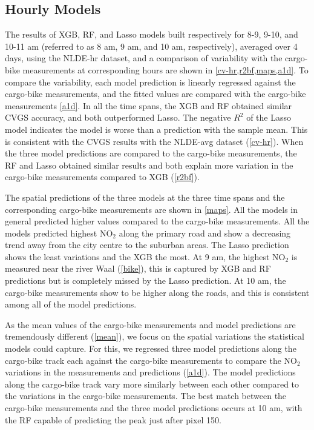 \documentclass{article}
\begin{document}
 
\subsection{Hourly Models}
The results of XGB, RF, and Lasso models built respectively for 8-9, 9-10, and 10-11 am (referred to as 8 am, 9 am, and 10 am, respectively), averaged over 4 days, using the NLDE-hr dataset, and a comparison of variability with the cargo-bike measurements at corresponding hours are shown in \cref{cv-hr,r2bf,maps,a1d}. To compare the variability, each model prediction is linearly regressed against the cargo-bike measurements, and the fitted values are compared with the cargo-bike measurements \cref{a1d}. In all the time spans, the XGB and RF obtained similar CVGS accuracy, and both outperformed Lasso. The negative $R^2$ of the Lasso model indicates the model is worse than a prediction with the sample mean. This is consistent with the CVGS results with the NLDE-avg dataset (\cref{cv-hr}). When the three model predictions are compared to the cargo-bike measurements, the RF and Lasso obtained similar results and both explain more variation in the cargo-bike measurements compared to XGB (\cref{r2bf}).  
 
 The spatial predictions of the three models at the three time spans and the corresponding cargo-bike measurements are shown in \cref{maps}. All the models in general predicted higher values compared to the cargo-bike measurements. All the models predicted highest NO$_2$ along the primary road and show a decreasing trend away from the city centre to the suburban areas. The Lasso prediction shows the least variations and the XGB the most. At 9 am, the highest NO$_2$ is measured near the river Waal (\cref{bike}), this is captured by XGB and RF predictions but is completely missed by the Lasso prediction. At 10 am, the cargo-bike measurements show to be higher along the roads, and this is consistent among all of the model predictions.  
 
 As the mean values of the cargo-bike measurements and model predictions are tremendously different (\cref{mean}), we focus on the spatial variations the statistical models could capture. For this, we regressed three model predictions along the cargo-bike track each against the cargo-bike measurements to compare the NO$_2$ variations in the measurements and predictions (\cref{a1d}). The model predictions along the cargo-bike track vary more similarly between each other compared to the variations in the cargo-bike measurements.  The best match between the cargo-bike measurements and the three model predictions occurs at 10 am, with the RF capable of predicting the peak just after pixel 150.  
 
\end{document}
